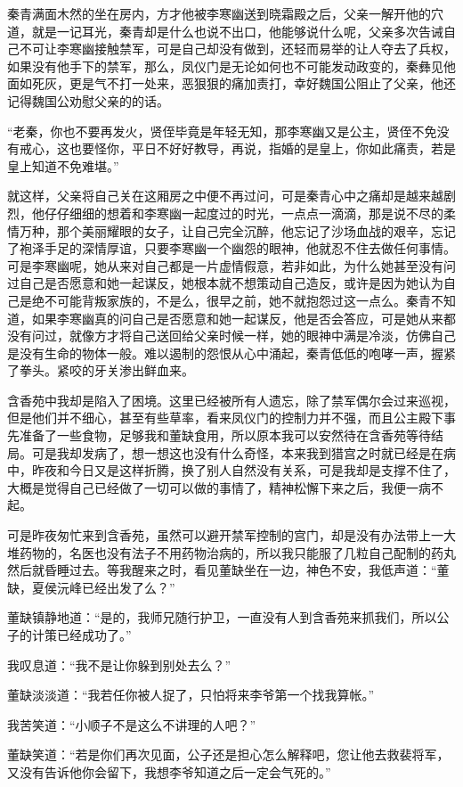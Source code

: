秦青满面木然的坐在房内，方才他被李寒幽送到晓霜殿之后，父亲一解开他的穴道，就是一记耳光，秦青却是什么也说不出口，他能够说什么呢，父亲多次告诫自己不可让李寒幽接触禁军，可是自己却没有做到，还轻而易举的让人夺去了兵权，如果没有他手下的禁军，那么，凤仪门是无论如何也不可能发动政变的，秦彝见他面如死灰，更是气不打一处来，恶狠狠的痛加责打，幸好魏国公阻止了父亲，他还记得魏国公劝慰父亲的的话。

“老秦，你也不要再发火，贤侄毕竟是年轻无知，那李寒幽又是公主，贤侄不免没有戒心，这也要怪你，平日不好好教导，再说，指婚的是皇上，你如此痛责，若是皇上知道不免难堪。”

就这样，父亲将自己关在这厢房之中便不再过问，可是秦青心中之痛却是越来越剧烈，他仔仔细细的想着和李寒幽一起度过的时光，一点点一滴滴，那是说不尽的柔情万种，那个美丽耀眼的女子，让自己完全沉醉，他忘记了沙场血战的艰辛，忘记了袍泽手足的深情厚谊，只要李寒幽一个幽怨的眼神，他就忍不住去做任何事情。可是李寒幽呢，她从来对自己都是一片虚情假意，若非如此，为什么她甚至没有问过自己是否愿意和她一起谋反，她根本就不想策动自己造反，或许是因为她认为自己是绝不可能背叛家族的，不是么，很早之前，她不就抱怨过这一点么。秦青不知道，如果李寒幽真的问自己是否愿意和她一起谋反，他是否会答应，可是她从来都没有问过，就像方才将自己送回给父亲时候一样，她的眼神中满是冷淡，仿佛自己是没有生命的物体一般。难以遏制的怨恨从心中涌起，秦青低低的咆哮一声，握紧了拳头。紧咬的牙关渗出鲜血来。

含香苑中我却是陷入了困境。这里已经被所有人遗忘，除了禁军偶尔会过来巡视，但是他们并不细心，甚至有些草率，看来凤仪门的控制力并不强，而且公主殿下事先准备了一些食物，足够我和董缺食用，所以原本我可以安然待在含香苑等待结局。可是我却发病了，想一想这也没有什么奇怪，本来我到猎宫之时就已经是在病中，昨夜和今日又是这样折腾，换了别人自然没有关系，可是我却是支撑不住了，大概是觉得自己已经做了一切可以做的事情了，精神松懈下来之后，我便一病不起。

可是昨夜匆忙来到含香苑，虽然可以避开禁军控制的宫门，却是没有办法带上一大堆药物的，名医也没有法子不用药物治病的，所以我只能服了几粒自己配制的药丸然后就昏睡过去。等我醒来之时，看见董缺坐在一边，神色不安，我低声道：“董缺，夏侯沅峰已经出发了么？”

董缺镇静地道：“是的，我师兄随行护卫，一直没有人到含香苑来抓我们，所以公子的计策已经成功了。”

我叹息道：“我不是让你躲到别处去么？”

董缺淡淡道：“我若任你被人捉了，只怕将来李爷第一个找我算帐。”

我苦笑道：“小顺子不是这么不讲理的人吧？”

董缺笑道：“若是你们再次见面，公子还是担心怎么解释吧，您让他去救裴将军，又没有告诉他你会留下，我想李爷知道之后一定会气死的。”

